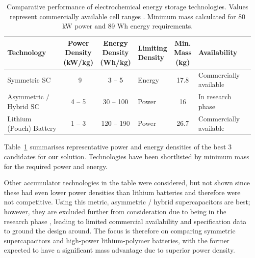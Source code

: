 \begin{table}[htbp]
    \centering
    \caption{Comparative performance of electrochemical energy storage technologies. Values represent commercially available cell ranges \cite{kalaiarasi2024tale}. Minimum mass calculated for 80 kW power and 89 Wh energy requirements.}
    \label{tab:storage_comparison}
    \footnotesize
    \begin{tabular}{|l|c|c|l|c|l|}
        \hline
        \textbf{Technology} & \makecell{\textbf{Power} \\ \textbf{Density} \\ \textbf{(kW/kg)}} & \makecell{\textbf{Energy} \\ \textbf{Density} \\ \textbf{(Wh/kg)}} & \makecell{\textbf{Limiting} \\ \textbf{Density}} & \makecell{\textbf{Min.} \\ \textbf{Mass} \\ \textbf{(kg)}} & \textbf{Availability} \\
        \hline
        Symmetric SC & ~9 & 3 -- 5 & Energy & 17.8 & Commercially available \\
        Asymmetric / Hybrid SC & 4 -- 5 & 30 -- 100 & Power & 16 & In research phase \\
        Lithium (Pouch) Battery & 1 -- 3 & 120 -- 190 & Power & 26.7 & Commercially available \\
        \hline
    \end{tabular}
\end{table}

Table~\ref{tab:storage_comparison} summarises representative power and energy densities of the best 3 candidates for our solution. Technologies have been shortlisted by minimum mass for the required power and energy.

Other accumulator technologies in the table were considered, but not shown since these had even lower power densities than lithium batteries and therefore were not competitive.
Using this metric, asymmetric / hybrid supercapacitors are best; however, they are excluded further from consideration due to being in the research phase \cite{kalaiarasi2024tale}, leading to limited commercial availability and specification data to ground the design around. The focus is therefore on comparing symmetric supercapacitors and high-power lithium-polymer batteries, with the former expected to have a significant mass advantage due to superior power density.



